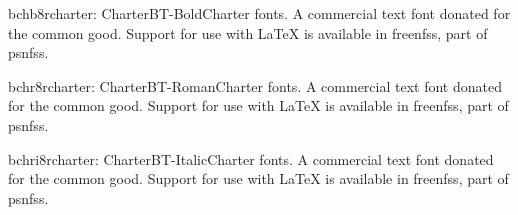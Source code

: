 \documentclass{ddltxtyp}
\begin{document}
\begin{package}{bchb8r}{charter: CharterBT-Bold}{Charter fonts.}
A commercial text font donated for the common good. Support for
use with {\LaTeX} is available in freenfss, part of psnfss.
\end{package}
\begin{package}{bchr8r}{charter: CharterBT-Roman}{Charter fonts.}
A commercial text font donated for the common good. Support for
use with {\LaTeX} is available in freenfss, part of psnfss.
\end{package}
\begin{package}{bchri8r}{charter: CharterBT-Italic}{Charter fonts.}
A commercial text font donated for the common good. Support for
use with {\LaTeX} is available in freenfss, part of psnfss.
\end{package}

\end{document}
